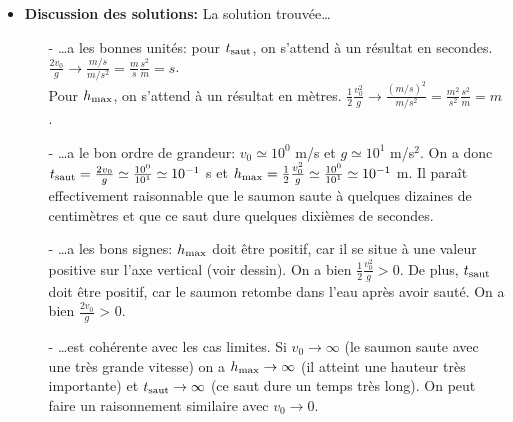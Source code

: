 \begin{enumerate}
\begin{itemize}
\item \textbf{Discussion des solutions:} La solution trouv\'ee\ldots\\
\begin{itemize}
\item[-] \ldots a les bonnes unit\'es: pour $t_{\rm saut}$, on s'attend \`a un r\'esultat en secondes. $\frac{2v_0}{g} \rightarrow \frac{m/s}{m/s^2} = \frac{m}{s}\frac{s^2}{m} = s$. \\
Pour $h_{\rm max}$, on s'attend \`a un r\'esultat en m\`etres. $\frac{1}{2}\frac{v_0^2}{g} \rightarrow \frac{(m/s)^2}{m/s^2} = \frac{m^2}{s^2}\frac{s^2}{m} = m$. \\
\item[-] \ldots a le bon ordre de grandeur: $v_0 \simeq 10^0$ m/s et $g \simeq 10^1$ m/s$^2$. On a donc $t_{\rm saut} = \frac{2v_0}{g} \simeq \frac{10^0}{10^1} \simeq 10^{-1}$ s et $h_{\rm max} = \frac{1}{2}\frac{v_0^2}{g} \simeq \frac{10^0}{10^1} \simeq 10^{-1}$ m. Il para\^it effectivement raisonnable que le saumon saute \`a quelques dizaines de centim\`etres et que ce saut dure quelques  dixi\`emes de secondes. \\
\item[-] \ldots a les bons signes: $h_{\rm max}$ doit \^etre positif, car il se situe \`a une valeur positive sur l'axe vertical (voir dessin). On a bien $\frac{1}{2}\frac{v_0^2}{g} > 0$. De plus, $t_{\rm saut}$ doit \^etre positif, car le saumon retombe dans l'eau apr\`es avoir saut\'e. On a bien $\frac{2v_0}{g}$ > 0. \\
\item[-] \ldots est coh\'erente avec les cas limites. Si $v_0 \to \infty$ (le saumon saute avec une tr\`es grande vitesse) on a $h_{\rm max} \to \infty$ (il atteint une hauteur tr\`es importante) et $t_{\rm saut}\to \infty$ (ce saut dure un temps tr\`es long). On peut faire un raisonnement similaire avec $v_0 \to 0$. \\
\end{itemize}
\end{itemize}

\end{enumerate}




